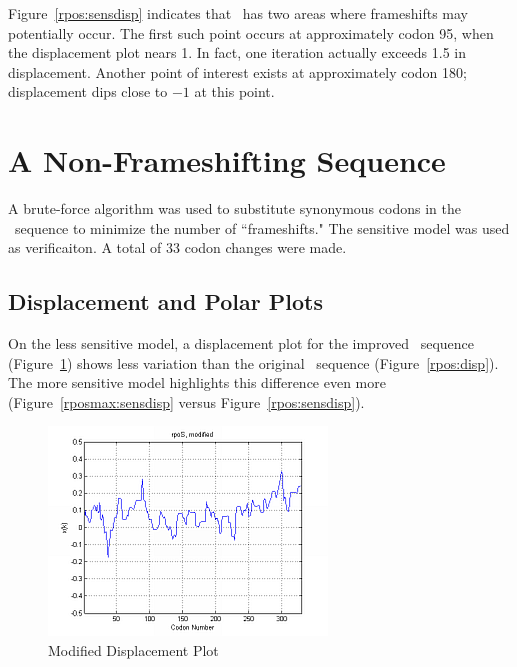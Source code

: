 \documentclass[10pt,twocolumn,draft]{article}
\begin{document}
Figure~\ref{rpos:sensdisp} indicates that \rpoS\ has two areas where frameshifts may potentially occur.
The first such point occurs at approximately codon 95, when the displacement plot nears 1.
In fact, one iteration actually exceeds 1.5 in displacement.
Another point of interest exists at approximately codon 180; displacement dips close to $-1$ at this point.

\section{A Non-Frameshifting Sequence}

A brute-force algorithm was used to substitute synonymous codons in the \rpoS\ sequence to minimize the number of ``frameshifts."
The sensitive model was used as verificaiton.  A total of 33 codon changes were made.

\subsection{Displacement and Polar Plots}

On the less sensitive model, a displacement plot for the improved \rpoS\ sequence (Figure~\ref{rposmax:disp}) shows less variation than the original \rpoS\ sequence (Figure~\ref{rpos:disp}).
The more sensitive model highlights this difference even more (Figure~\ref{rposmax:sensdisp} versus Figure~\ref{rpos:sensdisp}).

\begin{figure}[htp]
    \centering
    \caption{Modified \rpoS Displacement Plot}
    \label{rposmax:disp}
    \includegraphics[scale=1]{rpoS/max.png}
\end{figure}
\end{document}

